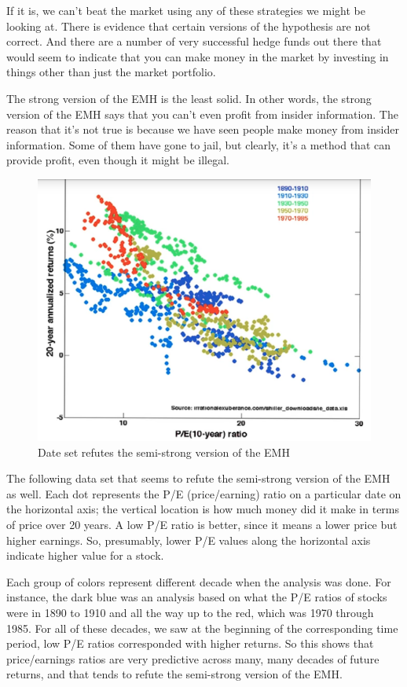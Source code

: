 \documentclass[12pt]{article}
\begin{document}
If it is, we can't beat the market using any of these strategies we might be looking at. There is evidence that certain versions of the hypothesis are not correct. And there are a number of very successful hedge funds out there that would seem to indicate that you can make money in the market by investing in things other than just the market portfolio. 

The strong version of the EMH is the least solid. In other words, the strong version of the EMH says that you can't even profit from insider information. The reason that it's not true is because we have seen people make money from insider information. Some of them have gone to jail, but clearly, it's a method that can provide profit, even though it might be illegal. 

\begin{figure}[!ht]
\centering
\includegraphics[scale=0.5]{fig/fig59}
\caption{Date set refutes the semi-strong version of the EMH}
\end{figure}

The following data set that seems to refute the semi-strong version of the EMH as well. Each dot represents the P/E (price/earning) ratio on a particular date on the horizontal axis; the vertical location is how much money did it make in terms of price over 20 years. A low P/E ratio is better, since it means a lower price but higher earnings. So, presumably, lower P/E values along the horizontal axis indicate higher value for a stock. 

Each group of colors represent different decade when the analysis was done. For instance, the dark blue was an analysis based on what the P/E ratios of stocks were in 1890 to 1910 and all the way up to the red, which was 1970 through 1985. For all of these decades, we saw at the beginning of the corresponding time period, low P/E ratios corresponded with higher returns. So this shows that price/earnings ratios are very predictive across many, many decades of future returns, and that tends to refute the semi-strong version of the EMH. 
\end{document}

